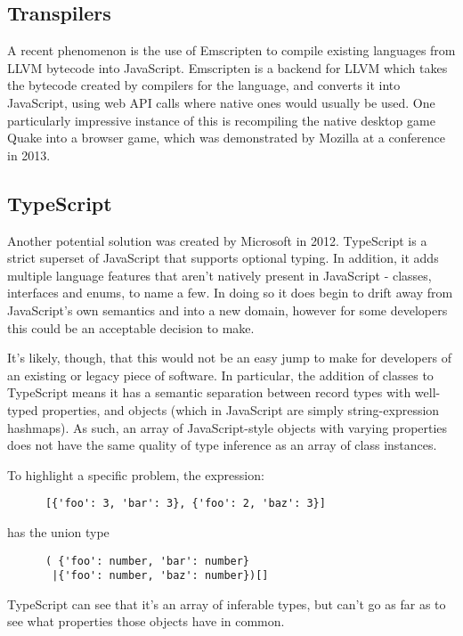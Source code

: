 \documentclass[british, twoside]{bhamthesis}
\theoremstyle{definition}
\begin{document}
  \subsection{Transpilers}

    A recent phenomenon is the use of Emscripten\autocite{Zakai} to compile existing languages from LLVM bytecode into JavaScript. Emscripten is a backend for LLVM which takes the bytecode created by compilers for the language, and converts it into JavaScript, using web API calls where native ones would usually be used. One particularly impressive instance of this is recompiling the native desktop game Quake into a browser game, which was demonstrated by Mozilla at a conference in 2013\autocite{unrealengine}.

  \subsection{TypeScript}

    Another potential solution was created by Microsoft in 2012. TypeScript is a strict superset of JavaScript that supports optional typing. In addition, it adds multiple language features that aren't natively present in JavaScript - classes, interfaces and enums, to name a few. In doing so it does begin to drift away from JavaScript's own semantics and into a new domain, however for some developers this could be an acceptable decision to make.

    It's likely, though, that this would not be an easy jump to make for developers of an existing or legacy piece of software. In particular, the addition of classes to TypeScript means it has a semantic separation between record types with well-typed properties, and objects (which in JavaScript are simply string-expression hashmaps). As such, an array of JavaScript-style objects with varying properties does not have the same quality of type inference as an array of class instances.

    To highlight a specific problem, the expression:
    \begin{lstlisting}
      [{'foo': 3, 'bar': 3}, {'foo': 2, 'baz': 3}]
    \end{lstlisting}
    has the union type
    \begin{lstlisting}
      ( {'foo': number, 'bar': number}
       |{'foo': number, 'baz': number})[]
    \end{lstlisting}

    TypeScript can see that it's an array of inferable types, but can't go as far as to see what properties those objects have in common.
\end{document}
